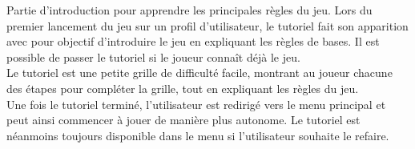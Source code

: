 {
	Partie d'introduction pour apprendre les principales règles du jeu.
}
{
    Lors du premier lancement du jeu sur un profil d'utilisateur, le tutoriel fait son apparition avec pour objectif d'introduire le jeu en expliquant les règles de bases. Il est possible de passer le tutoriel si le joueur connaît déjà le jeu.
    \\
    Le tutoriel est une petite grille de difficulté facile, montrant au joueur chacune des étapes pour compléter la grille, tout en expliquant les règles du jeu.
    \\
    Une fois le tutoriel terminé, l'utilisateur est redirigé vers le menu principal et peut ainsi commencer à jouer de manière plus autonome. Le tutoriel est néanmoins toujours disponible dans le menu si l'utilisateur souhaite le refaire.
}